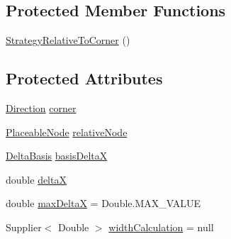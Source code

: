 \subsection*{Protected Member Functions}
\begin{DoxyCompactItemize}
\item 
\hyperlink{classorg_1_1tzi_1_1use_1_1gui_1_1views_1_1diagrams_1_1elements_1_1positioning_1_1_strategy_relative_to_corner_a847d0f88c6f20d0f16d036ef16cc81a8}{Strategy\-Relative\-To\-Corner} ()
\end{DoxyCompactItemize}
\subsection*{Protected Attributes}
\begin{DoxyCompactItemize}
\item 
\hyperlink{enumorg_1_1tzi_1_1use_1_1gui_1_1views_1_1diagrams_1_1util_1_1_direction}{Direction} \hyperlink{classorg_1_1tzi_1_1use_1_1gui_1_1views_1_1diagrams_1_1elements_1_1positioning_1_1_strategy_relative_to_corner_af656dfa44d83af4087acfc59cdb77e61}{corner}
\item 
\hyperlink{classorg_1_1tzi_1_1use_1_1gui_1_1views_1_1diagrams_1_1elements_1_1_placeable_node}{Placeable\-Node} \hyperlink{classorg_1_1tzi_1_1use_1_1gui_1_1views_1_1diagrams_1_1elements_1_1positioning_1_1_strategy_relative_to_corner_a1740e2ec6edf43bd66849d5bdd30c1b3}{relative\-Node}
\item 
\hyperlink{enumorg_1_1tzi_1_1use_1_1gui_1_1views_1_1diagrams_1_1elements_1_1positioning_1_1_strategy_relative_to_corner_1_1_delta_basis}{Delta\-Basis} \hyperlink{classorg_1_1tzi_1_1use_1_1gui_1_1views_1_1diagrams_1_1elements_1_1positioning_1_1_strategy_relative_to_corner_ad6493806cbefbbaa2051000d96b777cf}{basis\-Delta\-X}
\item 
double \hyperlink{classorg_1_1tzi_1_1use_1_1gui_1_1views_1_1diagrams_1_1elements_1_1positioning_1_1_strategy_relative_to_corner_ab711840a1d7896f981655e5dbb015513}{delta\-X}
\item 
double \hyperlink{classorg_1_1tzi_1_1use_1_1gui_1_1views_1_1diagrams_1_1elements_1_1positioning_1_1_strategy_relative_to_corner_a5219aa0d78b65f4c72257477a55e3155}{max\-Delta\-X} = Double.\-M\-A\-X\-\_\-\-V\-A\-L\-U\-E
\item 
Supplier$<$ Double $>$ \hyperlink{classorg_1_1tzi_1_1use_1_1gui_1_1views_1_1diagrams_1_1elements_1_1positioning_1_1_strategy_relative_to_corner_a07d2f47d26dde6e0b616b8a8d99209a1}{width\-Calculation} = null
\item 

\end{DoxyCompactItemize}
